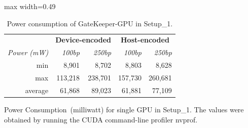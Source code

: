 \begin{table}[!htbp]
\centering
\caption{Power consumption of GateKeeper-GPU in Setup\_1.}
\label{tab:power}
\begin{adjustbox}{max width=0.49\textwidth}
\begin{tabular}{r|rr|rr}
\multicolumn{1}{c}{}                     & \multicolumn{2}{c}{\textbf{Device-encoded} } & \multicolumn{2}{c}{\textbf{Host-encoded} }  \\
\multicolumn{1}{r}{\textit{Power (mW) }} & \textit{100bp}  & \textit{250bp}             & \textit{100bp}  & \textit{250bp}            \\ 
\hline \rule{0pt}{2ex}
min                                      & 8,901           & 8,702                      & 8,803           & 8,628                     \\
max                                      & 113,218         & 238,701                    & 157,730         & 260,681                   \\
average                                  & 61,868          & 89,023                     & 61,881          & 77,109                    \\
\hline
\end{tabular}
\end{adjustbox}
\begin{minipage}{0.49\textwidth}
\vspace*{0.2cm}
\scriptsize
Power Consumption~(milliwatt) for single GPU in Setup\_1. The values were obtained by running the CUDA command-line profiler nvprof. 
\end{minipage}
\end{table}